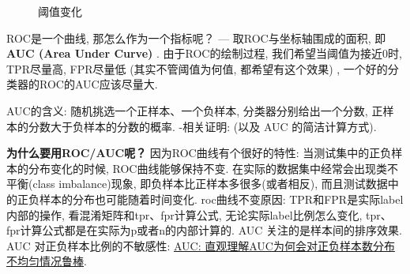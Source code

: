 \begin{figure}[h]
	\centering
	\quad
	\caption{阈值变化}
	\label{fig:threshold-change}
\end{figure}
ROC是一个曲线, 那怎么作为一个指标呢？ --- 取ROC与坐标轴围成的面积, 即\textbf{AUC (Area Under Curve) }. 由于ROC的绘制过程, 我们希望当阈值为接近0时, TPR尽量高, FPR尽量低 (其实不管阈值为何值, 都希望有这个效果) , 一个好的分类器的ROC的AUC应该尽量大. 

AUC的含义: 随机挑选一个正样本、一个负样本, 分类器分别给出一个分数, 正样本的分数大于负样本的分数的概率. -相关证明: \href{http://vividfree.github.io/%E6%9C%BA%E5%99%A8%E5%AD%A6%E4%B9%A0/2015/11/20/understanding-ROC-and-AUC}{\tbc{red}{理解 ROC 和 AUC}} (以及 AUC 的简洁计算方式). 

\textbf{为什么要用ROC/AUC呢？}\newline
因为ROC曲线有个很好的特性: 当测试集中的正负样本的分布变化的时候, ROC曲线能够保持不变. 在实际的数据集中经常会出现类不平衡(class imbalance)现象, 即负样本比正样本多很多(或者相反), 而且测试数据中的正负样本的分布也可能随着时间变化. roc曲线不变原因: TPR和FPR是实际label内部的操作, 看混淆矩阵和tpr、fpr计算公式, 无论实际label比例怎么变化, tpr、fpr计算公式都是在实际为p或者n的内部计算的. AUC 关注的是样本间的排序效果. AUC 对正负样本比例的不敏感性: \href{https://blog.csdn.net/Leon_winter/article/details/104673047}{AUC: 直观理解AUC为何会对正负样本数分布不均匀情况鲁棒}. 

